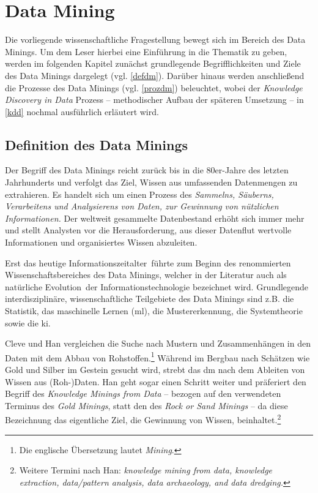 \section{Data Mining}
\label{dm}
Die vorliegende wissenschaftliche Fragestellung bewegt sich im Bereich des Data Minings. Um dem Leser hierbei eine Einführung in die Thematik zu geben, werden im folgenden Kapitel zunächst grundlegende  Begrifflichkeiten und Ziele des Data Minings dargelegt (vgl. \vref{defdm}). Darüber hinaus werden anschließend die Prozesse des Data Minings (vgl. \vref{prozdm}) beleuchtet, wobei der \textit{Knowledge Discovery in Data} Prozess -- methodischer Aufbau der späteren Umsetzung -- in \vref{kdd} nochmal ausführlich erläutert wird.

\subsection{Definition des Data Minings}
\label{defdm}

Der Begriff des Data Minings reicht zurück bis in die 80er-Jahre des letzten Jahrhunderts und verfolgt das Ziel, Wissen aus umfassenden Datenmengen zu extrahieren. Es handelt sich um einen Prozess des \glqq  \textit{Sammelns, Säuberns, Verarbeitens und Analysierens von Daten, zur Gewinnung von nützlichen Informationen.}\grqq{} Der weltweit gesammelte Datenbestand erhöht sich immer mehr und stellt Analysten vor die Herausforderung, aus dieser Datenflut wertvolle Informationen und organisiertes Wissen abzuleiten.

\enlargethispage{2\baselineskip}Erst das heutige \glqq Informationszeitalter\grqq~führte zum Beginn des renommierten Wissenschaftsbereiches des Data Minings, welcher in der Literatur auch als \glqq natürliche Evolution\grqq~der Informationstechnologie bezeichnet wird. Grundlegende interdisziplinäre, wissenschaftliche Teilgebiete des Data Minings sind z.B. die Statistik, das maschinelle Lernen (\gls{ml}), die Mustererkennung, die Systemtheorie sowie die \gls{ki}.


Cleve und Han vergleichen die Suche nach Mustern und Zusammenhängen in den Daten mit dem Abbau von Rohstoffen.\footnote{Die englische Übersetzung lautet \textit{\glqq Mining\grqq}.} Während im Bergbau nach Schätzen wie Gold und Silber im Gestein gesucht wird, strebt das \gls{dm} nach dem Ableiten von Wissen aus (Roh-)Daten. Han geht sogar einen Schritt weiter und präferiert den Begriff des \textit{Knowledge Minings from Data} -- bezogen auf den verwendeten Terminus des \textit{Gold Minings}, statt den des \textit{Rock or Sand Minings} -- da diese Bezeichnung das eigentliche Ziel, die Gewinnung von Wissen, beinhaltet.\footnote{Weitere Termini nach Han: \textit{knowledge mining from data, knowledge extraction, data/pattern analysis, data archaeology, and data dredging.}}

